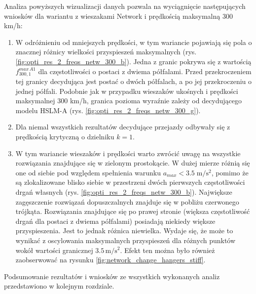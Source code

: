 Analiza powyższych wizualizacji danych pozwala na wyciągnięcie następujących wniosków dla wariantu z wieszakami Network i prędkością maksymalną 300 km/h:
\begin{enumerate}
	\item W odróżnieniu od mniejszych prędkości, w tym wariancie pojawiają się pola o znacznej różnicy wielkości przyspieszeń maksymalnych (rys. \ref{fig:opti_res_2_freqs_netw_300_b}). Jedna z granic pokrywa się z wartością $f_{300,1}^{max\,A1}$ dla częstotliwości o postaci z dwiema półfalami. Przed przekroczeniem tej granicy decydująca jest postać o dwóch półfalach, a po jej przekroczeniu o jednej półfali. Podobnie jak w przypadku wieszaków ukośnych i prędkości maksymalnej 300 km/h, granica pozioma wyraźnie zależy od decydującego modelu HSLM-A (rys. \ref{fig:opti_res_2_freqs_netw_300_g}).
	\item Dla niemal wszystkich rezultatów decydujące przejazdy odbywały się z prędkością krytyczną o dzielniku $k=1$.
	\item W tym wariancie wieszaków i prędkości warto zwrócić uwagę na wszystkie rozwiązania znajdujące się w zielonym prostokącie. W dużej mierze różnią się one od siebie pod względem spełnienia warunku $a_{max}<3.5\;\mathrm{m/s^2}$, pomimo że są zlokalizowane blisko siebie w przestrzeni dwóch pierwszych częstotliwości drgań własnych (rys. \ref{fig:opti_res_2_freqs_netw_300_b}). Największe zagęszczenie rozwiązań dopuszczalnych znajduje się w pobliżu czerwonego trójkąta. Rozwiązania znajdujące się po prawej stronie (większa częstotliwość drgań dla postaci z dwiema półfalami) posiadają niekiedy większe przyspieszenia. Jest to jednak różnica niewielka. Wydaje się, że może to wynikać z oscylowania maksymalnych przyspieszeń dla różnych punktów wokół wartości granicznej $3.5\,\mathrm{m/s^2}$. Efekt ten można było również zaobserwować na rysunku \ref{fig:network_change_hangers_stiff}.
\end{enumerate}

Podsumowanie rezultatów i wniosków ze wszystkich wykonanych analiz przedstawiono w kolejnym rozdziale.


